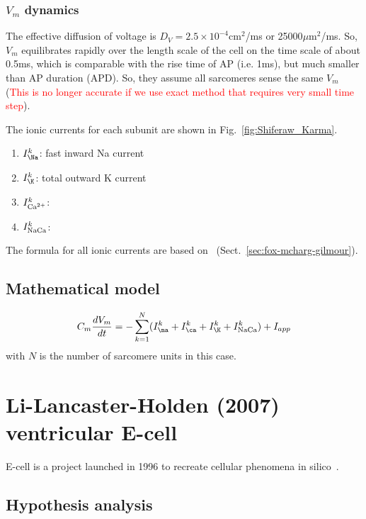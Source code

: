 \subsubsection{$V_m$ dynamics}
\label{sec:v_m-dynamics}

The effective diffusion of voltage is $D_V=2.5\times10^{-4}$cm$^2$/ms
or 25000$\mu$m$^2$/ms.  So, $V_m$ equilibrates rapidly over the length
scale of the cell on the time scale of about 0.5ms, which is
comparable with the rise time of AP (i.e. 1ms), but much smaller than
AP duration (APD). So, they assume all sarcomeres sense the same $V_m$
(\textcolor{red}{This is no longer accurate if we use exact method
  that requires very small time step}).

The ionic currents for each subunit are shown in
Fig.~\ref{fig:Shiferaw_Karma}. 
\begin{enumerate}
\item $I^k_\Na$: fast inward Na current

\item $I^k_\K$: total outward K current

\item $I^k_{\text{Ca}^{2+}}$:

\item $I^k_{\text{NaCa}}$:  
\end{enumerate}
The formula for all ionic currents are based on~\citep{fox2002}
(Sect.~\ref{sec:fox-mcharg-gilmour}). 

\subsection{Mathematical model}
\label{sec:mathematical-model-19}

\begin{equation}
  \label{eq:1047}
  C_m\frac{dV_m}{dt} = -\sum_{k=1}^N (I^k_\na+I^k_\ca+I^k_\K+I^k_\NaCa)+I_{app}
\end{equation}
with $N$ is the number of sarcomere units in this case.




\section{Li-Lancaster-Holden (2007) ventricular E-cell}
\label{sec:li-lancaster-holden}

E-cell is a project launched in 1996 to recreate cellular phenomena in
silico~\citep{tomita1999}.

\subsection{Hypothesis analysis}
\label{sec:hypothesis-analysis-19}


